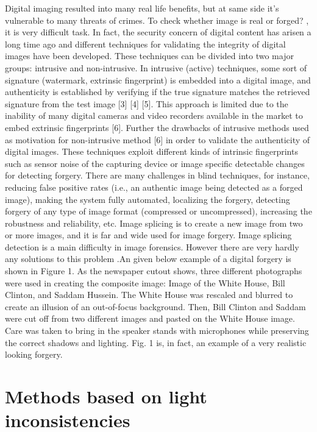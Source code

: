Digital imaging resulted into many real life benefits, but at same side it's vulnerable to many threats of crimes. To check whether image is real or forged? , it is very difficult task. In fact, the security concern of digital content has arisen a long time ago and different techniques for validating the integrity of digital images have been developed. These techniques can be divided into two major groups: intrusive and non-intrusive. In intrusive (active) techniques, some sort of signature (watermark, extrinsic fingerprint) is embedded into a digital image, and authenticity is established by verifying if the true signature matches the retrieved signature from the test image [3] [4] [5]. This approach is limited due to the inability of many digital cameras and video recorders available in the market to embed extrinsic fingerprints [6]. Further the drawbacks of intrusive methods used as motivation for non-intrusive method [6] in order to validate the authenticity of digital images. These techniques exploit different kinds of intrinsic fingerprints such as sensor noise of the capturing device or image specific detectable changes for detecting forgery. There are many challenges in blind techniques, for instance, reducing false positive rates (i.e., an authentic image being detected as a forged image), making the system fully automated, localizing the forgery, detecting forgery of any type of image format (compressed or uncompressed), increasing the robustness and reliability, etc.
Image splicing is to create a new image from two or more images, and it is far and wide used for image forgery. Image splicing detection is a main difficulty in image forensics. However there are very hardly any solutions to this problem .An given below example of a digital forgery is shown in Figure 1. As the newspaper cutout shows, three different photographs were used in creating the composite image: Image of the White House, Bill Clinton, and Saddam Hussein. The White House was rescaled and blurred to create an illusion of an out-of-focus background. Then, Bill Clinton and Saddam were cut off from two different images and pasted on the White House image. Care was taken to bring in the speaker stands with microphones while preserving the correct shadows and lighting. Fig. 1 is, in fact, an example of a very realistic looking forgery.

\section{Methods based on light inconsistencies}